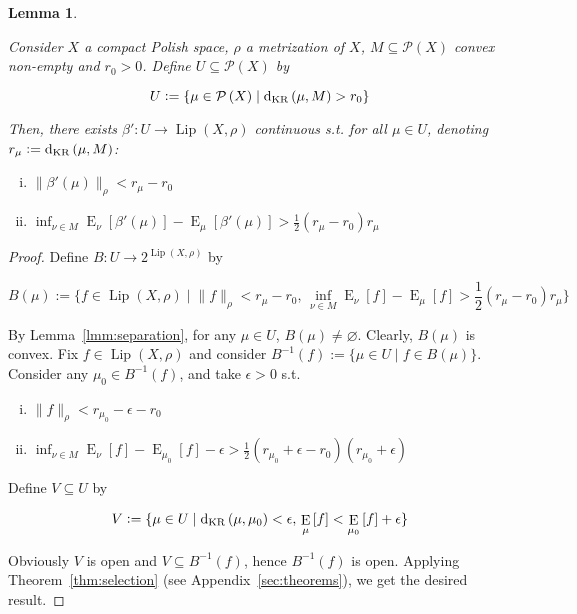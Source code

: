 \documentclass[11pt]{article}
\theoremstyle{definition}
\theoremstyle{plain}
\newtheorem{lemma}{Lemma}%
\newcommand{\N}[1]{\lVert #1 \rVert}
\DeclareMathOperator{\E}{E}
\newcommand{\PM}{\mathcal{P}}
\newcommand{\Lp}{{\operatorname{Lip}}}
\newcommand{\DKR}{\operatorname{d}_{\textnormal{KR}}}
\begin{document}
\begin{samepage}
\begin{lemma}
\label{lmm:savvy_outside}

Consider $X$ a compact Polish space, $\rho$ a metrization of $X$, $M \subseteq \PM\left(X\right)$ convex non-empty and $r_0 > 0$. Define $U \subseteq \PM\left(X\right)$ by

\begin{equation*}
U := \{\mu \in \PM\left(X\right) \mid \DKR\left(\mu,M\right) > r_0\}
\end{equation*}

Then, there exists $\beta': U \rightarrow \Lp\left(X,\rho\right)$ continuous s.t. for all $\mu \in U$, denoting $r_\mu:=\DKR\left(\mu,M\right)$:

\begin{enumerate}[i.]

\item $\N{\beta'\left(\mu\right)}_\rho < r_\mu - r_0$
\item $\inf_{\nu \in M} \E_\nu\left[\beta'\left(\mu\right)\right] - \E_\mu\left[\beta'\left(\mu\right)\right] > \frac{1}{2} \left(r_\mu - r_0\right) r_\mu$

\end{enumerate}

\end{lemma}
\end{samepage}

\begin{proof}

Define $B: U \rightarrow 2^{\Lp\left(X,\rho\right)}$ by

$$B\left(\mu\right):=\{f \in \Lp\left(X,\rho\right) \mid \N{f}_\rho < r_\mu - r_0,\, \inf_{\nu \in M} \E_\nu\left[f\right] - \E_\mu\left[f\right] > \frac{1}{2}\left(r_\mu - r_0\right) r_\mu\}$$

By Lemma~\ref{lmm:separation}, for any $\mu \in U$, $B\left(\mu\right) \ne \varnothing$. Clearly, $B\left(\mu\right)$ is convex. Fix $f \in \Lp\left(X,\rho\right)$ and consider $B^{-1}\left(f\right):=\{\mu \in U \mid f \in B\left(\mu\right)\}$. Consider any $\mu_0 \in B^{-1}\left(f\right)$, and take $\epsilon > 0$ s.t.

\begin{enumerate}[i.]

\item $\N{f}_\rho < r_{\mu_0}  - \epsilon - r_0$
\item $\inf_{\nu \in M} \E_\nu\left[f\right] - \E_{\mu_0}\left[f\right] -\epsilon > \frac{1}{2}\left(r_{\mu_0} + \epsilon  - r_0\right) \left(r_{\mu_0} + \epsilon\right)$

\end{enumerate}

Define $V \subseteq U$ by 

$$V := \{\mu \in U \mid \DKR\left(\mu,\mu_0\right) < \epsilon,\, \E_\mu\left[f\right] < \E_{\mu_0}\left[f\right] + \epsilon\}$$

Obviously $V$ is open and $V \subseteq B^{-1}\left(f\right)$, hence $B^{-1}\left(f\right)$ is open. Applying Theorem~\ref{thm:selection} (see Appendix~\ref{sec:theorems}), we get the desired result.
\end{proof}
\end{document}
